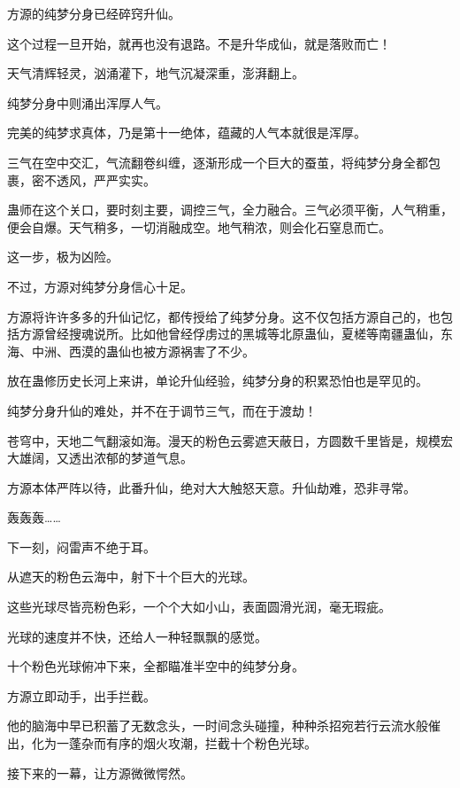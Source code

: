 
\begin{this_body}

方源的纯梦分身已经碎窍升仙。

这个过程一旦开始，就再也没有退路。不是升华成仙，就是落败而亡！

天气清辉轻灵，汹涌灌下，地气沉凝深重，澎湃翻上。

纯梦分身中则涌出浑厚人气。

完美的纯梦求真体，乃是第十一绝体，蕴藏的人气本就很是浑厚。

三气在空中交汇，气流翻卷纠缠，逐渐形成一个巨大的蚕茧，将纯梦分身全都包裹，密不透风，严严实实。

蛊师在这个关口，要时刻主要，调控三气，全力融合。三气必须平衡，人气稍重，便会自爆。天气稍多，一切消融成空。地气稍浓，则会化石窒息而亡。

这一步，极为凶险。

不过，方源对纯梦分身信心十足。

方源将许许多多的升仙记忆，都传授给了纯梦分身。这不仅包括方源自己的，也包括方源曾经搜魂说所。比如他曾经俘虏过的黑城等北原蛊仙，夏槎等南疆蛊仙，东海、中洲、西漠的蛊仙也被方源祸害了不少。

放在蛊修历史长河上来讲，单论升仙经验，纯梦分身的积累恐怕也是罕见的。

纯梦分身升仙的难处，并不在于调节三气，而在于渡劫！

苍穹中，天地二气翻滚如海。漫天的粉色云雾遮天蔽日，方圆数千里皆是，规模宏大雄阔，又透出浓郁的梦道气息。

方源本体严阵以待，此番升仙，绝对大大触怒天意。升仙劫难，恐非寻常。

轰轰轰……

下一刻，闷雷声不绝于耳。

从遮天的粉色云海中，射下十个巨大的光球。

这些光球尽皆亮粉色彩，一个个大如小山，表面圆滑光润，毫无瑕疵。

光球的速度并不快，还给人一种轻飘飘的感觉。

十个粉色光球俯冲下来，全都瞄准半空中的纯梦分身。

方源立即动手，出手拦截。

他的脑海中早已积蓄了无数念头，一时间念头碰撞，种种杀招宛若行云流水般催出，化为一蓬杂而有序的烟火攻潮，拦截十个粉色光球。

接下来的一幕，让方源微微愕然。


\end{this_body}

